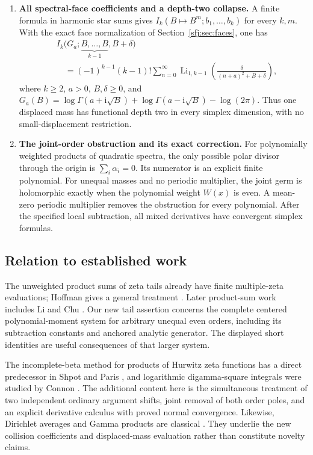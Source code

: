 \documentclass[11pt,letterpaper]{article}
\numberwithin{equation}{section}
\theoremstyle{definition}
\theoremstyle{remark}
\DeclareMathOperator{\Li}{Li}
\newcommand{\ii}{\mathrm i}
\begin{document}
\begin{enumerate}[label=\textbf{\arabic*.},leftmargin=*]
\item \textbf{All spectral-face coefficients and a depth-two collapse.}
A finite formula in harmonic star sums gives
\(I_k(B\mapsto B^m;b_1,\ldots,b_k)\) for every \(k,m\).
With the exact face normalization of
Section~\ref{sfj:sec:faces}, one has
\[
 \begin{aligned}
 &I_k\bigl(G_a;\underbrace{B,\ldots,B}_{k-1},B+\delta\bigr)\\
 &\quad=(-1)^{k-1}(k-1)!
 \sum_{n=0}^{\infty}
 \Li_{1,k-1}\left(\frac{\delta}{(n+a)^2+B+\delta}\right),
 \end{aligned}
\]
where \(k\ge2\), \(a>0\), \(B,\delta\ge0\), and
\(G_a(B)=\log\Gamma(a+\ii\sqrt B)+
\log\Gamma(a-\ii\sqrt B)-\log(2\pi)\).
Thus one displaced mass has functional depth two in every
simplex dimension, with no small-displacement restriction.

\item \textbf{The joint-order obstruction and its exact correction.}
For polynomially weighted products of quadratic spectra, the only
possible polar divisor through the origin is
\(\sum_i\alpha_i=0\). Its numerator is an explicit finite
polynomial. For unequal masses and no periodic multiplier, the joint germ is
holomorphic exactly when the polynomial weight \(W(x)\) is even.
A mean-zero periodic multiplier removes the obstruction for
every polynomial. After the specified local subtraction, all
mixed derivatives have convergent simplex formulas.
\end{enumerate}

\subsection{Relation to established work}

The unweighted product sums of zeta tails already have finite
multiple-zeta evaluations; Hoffman gives a general treatment
\cite{Hoffman}. Later product-sum work includes Li and Chu
\cite{LiChu}. Our new tail assertion concerns the complete
centered polynomial-moment system for arbitrary unequal even
orders, including its subtraction constants and anchored analytic
generator. The displayed short identities are useful consequences
of that larger system.

The incomplete-beta method for products of Hurwitz zeta functions
has a direct predecessor in Shpot and Paris
\cite{ShpotParis}, and logarithmic digamma-square integrals
were studied by Connon \cite{Connon}. The additional content
here is the simultaneous treatment of two independent ordinary
argument shifts, joint removal of both order poles, and an
explicit derivative calculus with proved normal convergence.
Likewise, Dirichlet averages and Gamma products are classical
\cite{Carlson,DLMF}. They underlie the new
collision coefficients and displaced-mass evaluation rather than
constitute novelty claims.
\end{document}
